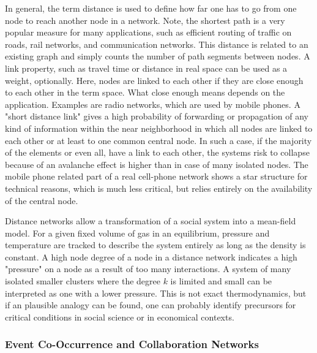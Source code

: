 \documentclass[a4paper,10pt]{scrbook}
\begin{document}
In general, the term distance is used to define how far one has to go from one node to reach another node in a network. Note, the shortest path is a very popular measure for many applications, such as efficient routing of traffic on roads, rail networks, and communication networks. This distance is related to an existing graph and simply counts the number of path segments between nodes. A link property, such as travel time or distance in real space can be used as a weight, optionally. Here, nodes are linked to each other if they are close enough to each other in the term space. What close enough means depends on the application. Examples are radio networks, which are used by mobile phones. A "short distance link" gives a high probability of forwarding or propagation of  any kind of information within the near neighborhood in which  all nodes are linked to each other or at least to one common central node. In such a case, if the majority of the elements or even all, have a link to each other, the systems risk to collapse because of an avalanche effect is higher than in case of many isolated nodes. The mobile phone related part of a real cell-phone network shows a star structure for technical reasons, which is much less critical, but relies entirely on the availability of the central node. 

Distance networks allow a transformation of a social system into a mean-field model. For a given fixed volume of gas in an equilibrium, pressure and temperature are tracked to describe the system entirely as long as the density is constant. A high node degree of a node in a distance network indicates a high "pressure" on a node as a result of too many interactions. A system of many isolated smaller clusters where the degree $k$ is limited and small can be interpreted as one with a lower pressure. This is not exact thermodynamics, but if an plausible analogy can be found, one can probably identify precursors for critical conditions in social science or in economical contexts.

\subsubsection*{Event Co-Occurrence and Collaboration Networks}
\end{document}
